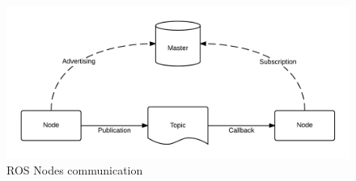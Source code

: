 \begin{figure}[ht]
    \centering
    \includegraphics[width=1\textwidth]{figures/A1/ROS-master-node-topic.png}
    \caption{ROS Nodes communication}
    \label{fig:orthorectification}
\end{figure}
